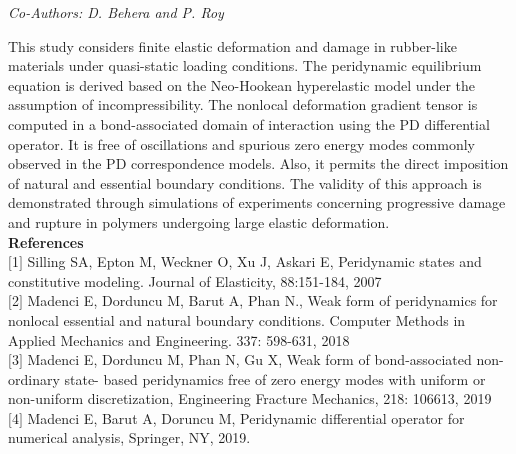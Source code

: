 \begin{center}
\textit{Co-Authors: D. Behera and P. Roy}
\end{center} 
This study considers finite elastic deformation and damage in rubber-like materials under quasi-static loading conditions.  The peridynamic equilibrium equation is derived based on the Neo-Hookean hyperelastic model under the assumption of incompressibility.  The nonlocal deformation gradient tensor is computed in a bond-associated domain of interaction using the PD differential operator.  It is free of oscillations and spurious zero energy modes commonly observed in the PD correspondence models.  Also, it permits the direct imposition of natural and essential boundary conditions.  The validity of this approach is demonstrated through simulations of experiments concerning progressive damage and rupture in polymers undergoing large elastic deformation.\\

\noindent\textbf{References}\\
$[$1$]$ Silling SA, Epton M, Weckner O, Xu J, Askari E, Peridynamic states and constitutive
modeling. Journal of Elasticity, 88:151-184, 2007\\\newline
$[$2$]$ Madenci E, Dorduncu M, Barut A, Phan N., Weak form of peridynamics for nonlocal essential
and natural boundary conditions. Computer Methods in Applied Mechanics and Engineering.
337: 598-631, 2018\\\newline
$[$3$]$ Madenci E, Dorduncu M, Phan N, Gu X, Weak form of bond-associated non-ordinary state-
based peridynamics free of zero energy modes with uniform or non-uniform discretization,
Engineering Fracture Mechanics, 218: 106613, 2019\\\newline
$[$4$]$ Madenci E, Barut A, Doruncu M, Peridynamic differential operator for numerical analysis,
Springer, NY, 2019.  
